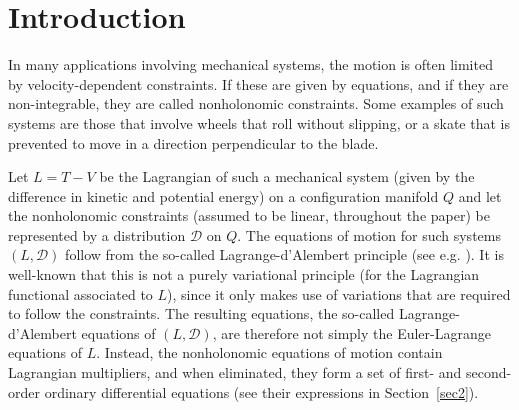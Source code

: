 \documentclass[11pt]{article}
\def\D{{\mathcal D}}
\begin{document}
\maketitle



\section{Introduction}

 In many applications involving mechanical systems, the motion is  often limited by velocity-dependent constraints. If these are given by equations, and if they are non-integrable, they are called nonholonomic constraints. Some examples of such systems are those that involve wheels that roll without slipping, or a skate that is prevented to move in a direction perpendicular to the blade. 

Let $L=T-V$ be the Lagrangian of such a mechanical system (given by the difference in kinetic and potential energy) on a configuration manifold $Q$ and let  the  nonholonomic constraints (assumed to be linear, throughout the paper) be represented by a distribution $\D$ on $Q$.  The equations of motion for such systems $(L,\D)$ follow from the so-called Lagrange-d'Alembert principle (see e.g. \cite{Bloch,Cortes}). It is well-known that this is not a purely variational principle (for the Lagrangian functional associated to $L$), since it only makes use of  variations that are required to follow the constraints. The resulting equations, the so-called Lagrange-d'Alembert equations of $(L,\D)$, are therefore not simply the Euler-Lagrange equations of $L$. Instead, the nonholonomic equations of motion contain Lagrangian multipliers, and when eliminated, they form a set of first- and second-order ordinary differential equations (see their expressions in Section~\ref{sec2}).
\end{document}
